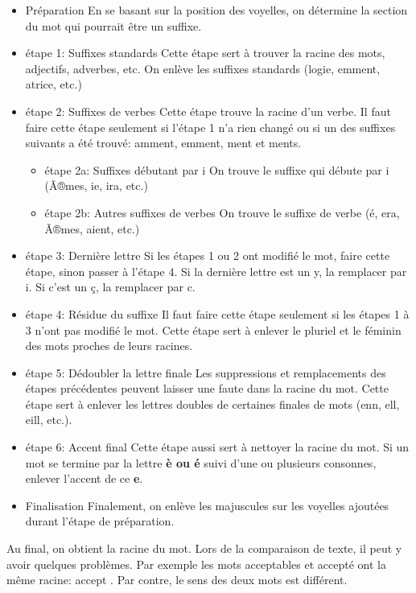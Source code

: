 \begin{itemize}
\item{Pr\'eparation}
En se basant sur la position des voyelles, on d\'etermine la section du mot qui pourrait \^etre un suffixe.
\item{\'etape 1: Suffixes standards}
Cette \'etape sert \`a trouver la racine des mots, adjectifs, adverbes, etc.
On enl\`eve les suffixes standards (logie, emment, atrice, etc.)
\item{\'etape 2: Suffixes de verbes}
Cette \'etape trouve la racine d'un verbe.
Il faut faire cette \'etape seulement si l'\'etape 1 n'a rien chang\'e ou si un des suffixes suivants a \'et\'e trouv\'e: amment, emment, ment et ments.
\begin{itemize}
\item{\'etape 2a: Suffixes d\'ebutant par i}
On trouve le suffixe qui d\'ebute par i (Ã®mes, ie, ira, etc.)
\item{\'etape 2b: Autres suffixes de verbes}
On trouve le suffixe de verbe (\'e, era, Ã®mes, aient, etc.)
\end{itemize}
\item{\'etape 3: Derni\`ere lettre}
Si les \'etapes 1 ou 2 ont modifi\'e le mot, faire cette \'etape, sinon passer \`a l'\'etape 4.
Si la derni\`ere lettre est un y, la remplacer par i.
Si c'est un \c{c}, la remplacer par c.
\item{\'etape 4: R\'esidue du suffixe}
Il faut faire cette \'etape seulement si les \'etapes 1 \`a 3 n'ont pas modifi\'e le mot.
Cette \'etape sert \`a enlever le pluriel et le f\'eminin des mots proches de leurs racines.
\item{\'etape 5: D\'edoubler la lettre finale}
Les suppressions et remplacements des \'etapes pr\'ec\'edentes peuvent laisser une faute dans la racine du mot.
Cette \'etape sert \`a enlever les lettres doubles de certaines finales de mots (enn, ell, eill, etc.).
\item{\'etape 6: Accent final}
Cette \'etape aussi sert \`a nettoyer la racine du mot.
Si un mot se termine par la lettre \textbf{\`e ou \'e} suivi d'une ou plusieurs consonnes, enlever l'accent de ce \textbf{e}.
\item{Finalisation}
Finalement, on enl\`eve les majuscules sur les voyelles ajout\'ees durant l'\'etape de pr\'eparation.
\end{itemize}
Au final, on obtient la racine du mot.
Lors de la comparaison de texte, il peut y avoir quelques probl\`emes.
Par exemple les mots \og acceptables \fg{} et \og accept\'e \fg{} ont la m\^eme racine: \og accept \fg{}.
Par contre, le sens des deux mots est diff\'erent.

